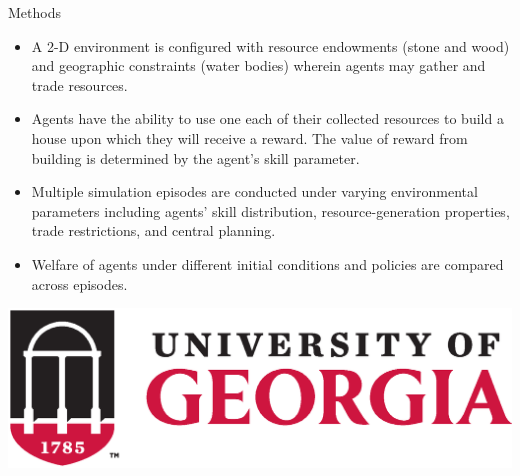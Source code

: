 \documentclass[final]{beamer}
\newlength{\onecolwid}
\begin{document}
\begin{frame}[t]
\begin{columns}[t]
\begin{column}{\onecolwid}
\begin{block}{Methods}
\begin{itemize}
    \item A 2-D environment is configured with resource endowments (stone and wood) and geographic constraints (water bodies) wherein agents may gather and trade resources. 
    \item Agents have the ability to use one each of their collected resources to build a house upon which they will receive a reward. The value of reward from building is determined by the agent's skill parameter.  
    \item Multiple simulation episodes are conducted under varying environmental parameters including agents' skill distribution, resource-generation properties, trade restrictions, and central planning. 
    \item Welfare of agents under different initial conditions and policies are compared across episodes.
\end{itemize}
\vspace{0.8cm}
\centering \includegraphics[scale = 1.4]{logos/uga.eps}
\end{block}
\end{column}



\end{columns}
\end{frame}
\end{document}
